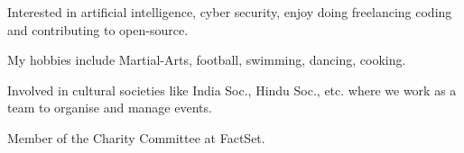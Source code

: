 

\begin{cventries}
	
	\cvmyskills
  {}
  {}
  {}
  {}
  {\vspace*{-\baselineskip}
	\begin{cvitems} %
		\item {Interested in artificial intelligence, cyber security, enjoy doing freelancing coding and contributing to open-source.}
		\item {My hobbies include Martial-Arts, football, swimming, dancing, cooking.}
		\item {Involved in cultural societies like India Soc., Hindu Soc., etc. where we work as a team to organise and manage events.}
		\item {Member of the Charity Committee at FactSet.}
	\end{cvitems}
  }
	
\end{cventries}